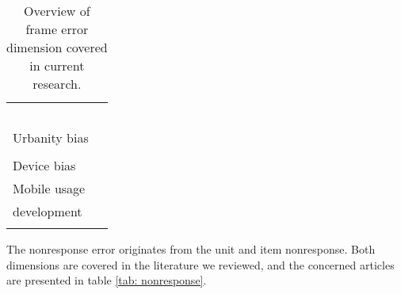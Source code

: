 \begin{table}
\begin{tabular}{ll}
        & \cite{de_bruijne_mobile_2014, zou_mobile_2021}\\
        & \cite{brosnan_pc_2017, antoun_simultaneous_2019}\\
        & \cite{skeie_smartphone_2019, bosch_using_2021}\\
        & \cite{keusch_web_2017, toepoel_what_2014}\\
        & \cite{wenz_willingness_2019}\\
        Urbanity bias & \cite{de_bruijne_mobile_2014, toepoel_what_2014}\\
        & \cite{keusch_coverage_2020}\\
        Device bias & \cite{keusch_coverage_2020}\\
        Mobile usage & \cite{revilla_online_2016, gummer_does_2019}\\
        development & \cite{de_bruijne_mobile_2014, wells_what_2015}\\
        & \cite{wenz_willingness_2019}\\
        \bottomrule
    \end{tabular}
	\caption{Overview of frame error dimension covered in current research.}
	\label{tab: frame}
\end{table}


The nonresponse error originates from the unit and item nonresponse. Both dimensions are covered in the literature we reviewed, and the concerned articles are presented in table \ref{tab: nonresponse}.

